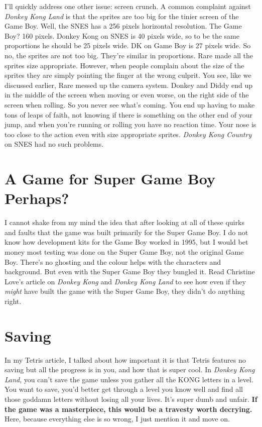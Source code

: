 \documentclass{book}
\begin{document}
I’ll quickly address one other issue: screen crunch. A common complaint against \emph{Donkey Kong Land} is that the sprites are too big for the tinier screen of the Game Boy. Well, the SNES has a 256 pixels horizontal resolution. The Game Boy? 160 pixels. Donkey Kong on SNES is 40 pixels wide, so to be the same proportions he should be 25 pixels wide. DK on Game Boy is 27 pixels wide. So no, the sprites are not too big. They’re similar in proportions. Rare made all the sprites size appropriate. However, when people complain about the size of the sprites they are simply pointing the finger at the wrong culprit. You see, like we discussed earlier, Rare messed up the camera system. Donkey and Diddy end up in the middle of the screen when moving or even worse, on the right side of the screen when rolling. So you never see what’s coming. You end up having to make tons of leaps of faith, not knowing if there is something on the other end of your jump, and when you’re running or rolling you have no reaction time. Your nose is too close to the action even with size appropriate sprites. \emph{Donkey Kong Country} on SNES had no such problems.\par
\FloatBarrier\vspace{\baselineskip}\begin{figure}[H]\end{figure}
\FloatBarrier\section*{A Game for Super Game Boy Perhaps?}
I cannot shake from my mind the idea that after looking at all of these quirks and faults that the game was built primarily for the Super Game Boy. I do not know how development kits for the Game Boy worked in 1995, but I would bet money most testing was done on the Super Game Boy, not the original Game Boy. There’s no ghosting and the colour helps with the characters and background. But even with the Super Game Boy they bungled it. Read Christine Love’s article on \emph{Donkey Kong} and \emph{Donkey Kong Land} to see how even if they \emph{might} have built the game with the Super Game Boy, they didn’t do anything right.\par
\FloatBarrier\section*{Saving}
In my Tetris article, I talked about how important it is that Tetris features no saving but all the progress is in you, and how that is super cool. In \emph{Donkey Kong Land}, you can’t save the game unless you gather all the KONG letters in a level. You want to save, you’d better get through a level you know well and find all those goddamn letters without losing all your lives. It’s super dumb and unfair. \textbf{If the game was a masterpiece, this would be a travesty worth decrying.} Here, because everything else is so wrong, I just mention it and move on.\par
\end{document}
